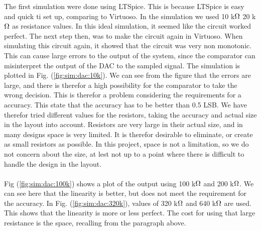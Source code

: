 \documentclass[english, 12pt, a4paper]{ifimaster}
\begin{document}
\newline
The first simulation were done using LTSpice. This is because LTSpice is easy and quick ti set up, comparing to Virtuoso. In the simulation we used 10 k\(\ohm\) 20 k\(\ohm\) as resistance values. 
In this ideal simulation, it seemed like the circuit worked perfect. The next step then, was to make the circuit again in Virtuoso. When simulating this circuit again, it showed that the circuit 
was very non monotonic. This can cause large errors to the output of the system, since the comparator can misinterpret the output of the DAC to the sampled signal. The simulation is plotted in 
Fig. (\ref{fig:sim:dac:10k}). We can see from the figure that the errors are large, and there is therefor a high possibility for the comparator to take the wrong decision. This is therefor a problem
considering the requirements for a accuracy. This state that the accuracy has to be better than 0.5 LSB. We have therefor tried different values for the resistors, taking the accuracy and 
actual size in the layout into account. Resistors are very large in their actual size, and in many designs space is very limited. It is therefor desirable to eliminate, or create as small resistors 
as possible. In this project, space is not a limitation, so we do not concern about the size, at lest not up to a point where there is difficult to handle the design in the layout. \\
\\
Fig (\ref{fig:sim:dac:100k}) shows a plot of the output using 100 k\(\ohm\) and 200 k\(\ohm\). We can see here that the linearity is better, but does not meet the requirement for the accuracy. In 
Fig. (\ref{fig:sim:dac:320k}), values of 320 k\(\ohm\) and 640 k\(\ohm\) are used. This shows that the linearity is more or less perfect. The cost for using that large resistance is the space, 
recalling from the paragraph above.  
\end{document}
